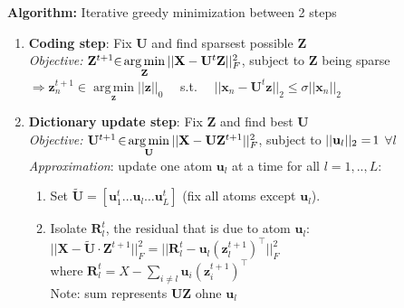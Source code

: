 \documentclass[a4paper,11pt]{article}
\newcommand{\argmin}{\operatorname*{arg\,min}}
\begin{document}
\begin{multicols}{2}
\textbf{Algorithm:} Iterative greedy minimization between 2 steps
\begin{enumerate}[leftmargin=0.4cm]
  \itemsep0em 
  \item \textbf{Coding step}: Fix \textbf{U} and find sparsest possible \textbf{Z}\\
  \emph{Objective:} $\mathbf Z^{t+1} \hspace{-0.1cm} \in \hspace{-0.05cm} \argmin \limits_{\mathbf Z} || \mathbf X - \mathbf U^t \mathbf Z||_F^2$, subject to $\mathbf Z$ being sparse\\ 
  \hspace{1.1cm}$\Rightarrow \mathbf{z}_n^{t+1} \in \argmin \limits_{\mathbf{z}} ||\mathbf{z}||_0 \quad$ s.t. $\quad || \mathbf x_n - \mathbf U^t \mathbf z||_2 \leq \sigma ||\mathbf x_n||_2$

  \item \textbf{Dictionary update step}: Fix \textbf{Z} and find best \textbf{U} \\
  \emph{Objective:} $\mathbf U^{t+1} \hspace{-0.05cm} \in \hspace{-0.05cm} \argmin \limits_{\mathbf U} ||\mathbf X - \mathbf U \mathbf Z^{t+1}||_F^2$, subject to  $||\mathbf u_l||_2=\hspace{-0.05cm}1$ $\forall l$ \\
  \emph{Approximation}:  update one atom $\mathbf{u}_l$ at a time for all $l = 1, ..,L$:

 \begin{enumerate}[leftmargin=0.5cm]
  \itemsep0em 
  \item Set $\tilde{\mathbf U} = [\mathbf u_1^t \ldots \mathbf u_l \ldots \mathbf u_L^t]$ (fix all atoms except $\mathbf u_l$).
  \item Isolate $\mathbf R_l^t$, the residual that is due to atom $\mathbf u_l$:\\
  $|| \mathbf X - \tilde{\mathbf U} \cdot \mathbf Z^{t+1} ||_F^2 
    = || \mathbf R_l^t - \mathbf u_l ( \mathbf z_l^{t+1})^\top||_F^2$\\
    where $\mathbf R_l^t = X - \sum_{i \neq l} \mathbf{u}_i (\mathbf{z}_i^{t+1})^\top \quad$\\
    Note: sum represents \textbf{U}\textbf{Z} ohne $\textbf{u}_l$


\end{enumerate}
\end{enumerate}
\end{multicols}
\end{document}
